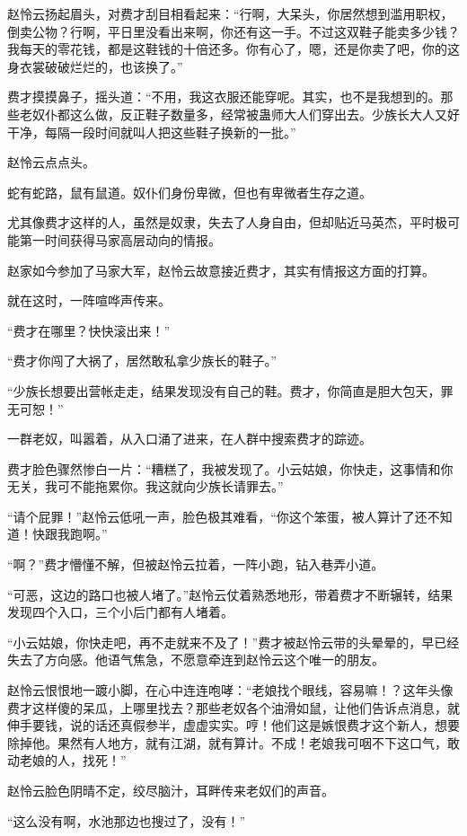 \begin{this_body}
赵怜云扬起眉头，对费才刮目相看起来：“行啊，大呆头，你居然想到滥用职权，倒卖公物？行啊，平日里没看出来啊，你还有这一手。不过这双鞋子能卖多少钱？我每天的零花钱，都是这鞋钱的十倍还多。你有心了，嗯，还是你卖了吧，你的这身衣裳破破烂烂的，也该换了。”

费才摸摸鼻子，摇头道：“不用，我这衣服还能穿呢。其实，也不是我想到的。那些老奴仆都这么做，反正鞋子数量多，经常被蛊师大人们穿出去。少族长大人又好干净，每隔一段时间就叫人把这些鞋子换新的一批。”

赵怜云点点头。

蛇有蛇路，鼠有鼠道。奴仆们身份卑微，但也有卑微者生存之道。

尤其像费才这样的人，虽然是奴隶，失去了人身自由，但却贴近马英杰，平时极可能第一时间获得马家高层动向的情报。

赵家如今参加了马家大军，赵怜云故意接近费才，其实有情报这方面的打算。

就在这时，一阵喧哗声传来。

“费才在哪里？快快滚出来！”

“费才你闯了大祸了，居然敢私拿少族长的鞋子。”

“少族长想要出营帐走走，结果发现没有自己的鞋。费才，你简直是胆大包天，罪无可恕！”

一群老奴，叫嚣着，从入口涌了进来，在人群中搜索费才的踪迹。

费才脸色骤然惨白一片：“糟糕了，我被发现了。小云姑娘，你快走，这事情和你无关，我可不能拖累你。我这就向少族长请罪去。”

“请个屁罪！”赵怜云低吼一声，脸色极其难看，“你这个笨蛋，被人算计了还不知道！快跟我跑啊。”

“啊？”费才懵懂不解，但被赵怜云拉着，一阵小跑，钻入巷弄小道。

“可恶，这边的路口也被人堵了。”赵怜云仗着熟悉地形，带着费才不断辗转，结果发现四个入口，三个小后门都有人堵着。

“小云姑娘，你快走吧，再不走就来不及了！”费才被赵怜云带的头晕晕的，早已经失去了方向感。他语气焦急，不愿意牵连到赵怜云这个唯一的朋友。

赵怜云恨恨地一踱小脚，在心中连连咆哮：“老娘找个眼线，容易嘛！？这年头像费才这样傻的呆瓜，上哪里找去？那些老奴各个油滑如鼠，让他们告诉点消息，就伸手要钱，说的话还真假参半，虚虚实实。哼！他们这是嫉恨费才这个新人，想要除掉他。果然有人地方，就有江湖，就有算计。不成！老娘我可咽不下这口气，敢动老娘的人，找死！”

赵怜云脸色阴晴不定，绞尽脑汁，耳畔传来老奴们的声音。

“这么没有啊，水池那边也搜过了，没有！”


\end{this_body}
